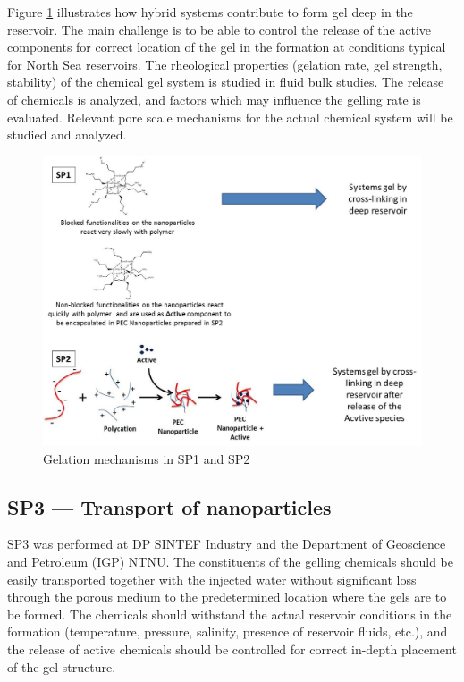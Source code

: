 Figure \ref{fig:sp1sp2} illustrates how hybrid systems contribute to form gel deep in the reservoir. The main challenge is to be able to control the release of the active components for correct location of the gel in the formation at conditions typical for North Sea reservoirs. The rheological properties (gelation rate, gel strength, stability) of the chemical gel system is studied in fluid bulk studies. The release of chemicals is analyzed, and factors which may influence the gelling rate is evaluated. Relevant pore scale mechanisms for the actual chemical system will be studied and analyzed.

\begin{figure}
    \centering
    \includegraphics[width=\textwidth]{img/fig/sp1sp2.png}
    \caption{Gelation mechanisms in SP1 and SP2 \citep{Cordova2008}}
    \label{fig:sp1sp2}
\end{figure}

\subsection*{SP3 --- Transport of nanoparticles}
%
SP3 was performed at DP SINTEF Industry and the Department of Geoscience and Petroleum (IGP) NTNU.  
The constituents of the gelling chemicals should be easily transported together with the injected water without significant loss through the porous medium to the predetermined location where the gels are to be formed. The chemicals should withstand the actual reservoir conditions in the formation (temperature, pressure, salinity, presence of reservoir fluids, etc.), and the release of active chemicals should be controlled for correct in-depth placement of the gel structure. 

